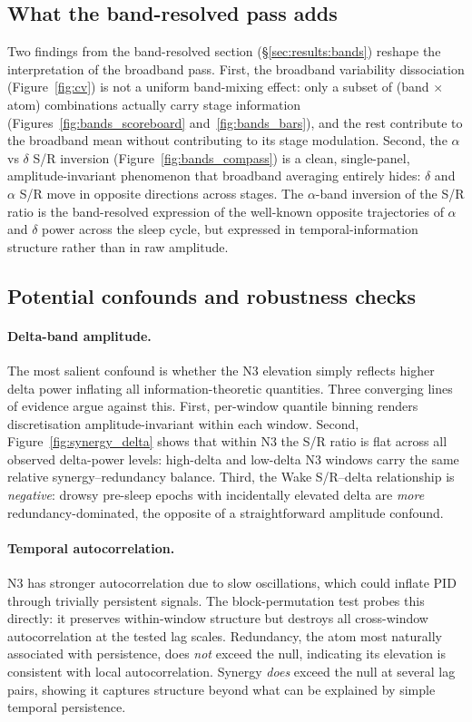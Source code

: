 \documentclass[11pt,a4paper]{article}
\begin{document}
\subsection{What the band-resolved pass adds}

Two findings from the band-resolved section (\S\ref{sec:results:bands})
reshape the interpretation of the broadband pass.  First, the broadband
variability dissociation (Figure~\ref{fig:cv}) is not a uniform
band-mixing effect: only a subset of (band $\times$ atom) combinations
actually carry stage information
(Figures~\ref{fig:bands_scoreboard} and~\ref{fig:bands_bars}), and the
rest contribute to the broadband mean without contributing to its stage
modulation.  Second, the $\alpha$ vs $\delta$ S/R inversion
(Figure~\ref{fig:bands_compass}) is a clean, single-panel,
amplitude-invariant phenomenon that broadband averaging entirely hides:
$\delta$ and $\alpha$ S/R move in opposite directions across stages.
The $\alpha$-band inversion of the S/R ratio is the band-resolved
expression of the well-known opposite trajectories of $\alpha$ and
$\delta$ power across the sleep cycle, but expressed in
temporal-information structure rather than in raw amplitude.

\subsection{Potential confounds and robustness checks}

\paragraph{Delta-band amplitude.}
The most salient confound is whether the N3 elevation simply reflects
higher delta power inflating all information-theoretic quantities.  Three
converging lines of evidence argue against this.  First, per-window
quantile binning renders discretisation amplitude-invariant within each
window.  Second, Figure~\ref{fig:synergy_delta} shows that within N3 the
S/R ratio is flat across all observed delta-power levels: high-delta and
low-delta N3 windows carry the same relative synergy--redundancy
balance.  Third, the Wake S/R--delta relationship is \emph{negative}:
drowsy pre-sleep epochs with incidentally elevated delta are \emph{more}
redundancy-dominated, the opposite of a straightforward amplitude
confound.

\paragraph{Temporal autocorrelation.}
N3 has stronger autocorrelation due to slow oscillations, which could
inflate PID through trivially persistent signals.  The block-permutation
test probes this directly: it preserves within-window structure but
destroys all cross-window autocorrelation at the tested lag scales.
Redundancy, the atom most naturally associated with persistence, does
\emph{not} exceed the null, indicating its elevation is consistent with
local autocorrelation.  Synergy \emph{does} exceed the null at several
lag pairs, showing it captures structure beyond what can be explained by
simple temporal persistence.
\end{document}
